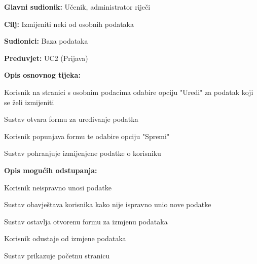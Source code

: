 				\noindent {}
				\begin{packed_item}
					
					\item \textbf{Glavni sudionik: }Učenik, administrator riječi
					\item  \textbf{Cilj:} Izmijeniti neki od osobnih podataka
					\item  \textbf{Sudionici:} Baza podataka
					\item  \textbf{Preduvjet:} UC2 (Prijava)
					\item  \textbf{Opis osnovnog tijeka:}
					
					\item[] \begin{packed_enum}
						
						\item Korisnik na stranici s osobnim podacima odabire opciju "Uredi" za podatak koji se želi izmijeniti
						\item Sustav otvara formu za uređivanje podatka
						\item Korisnik popunjava formu te odabire opciju "Spremi"
						\item Sustav pohranjuje izmijenjene podatke o korisniku
						
					\end{packed_enum}
					
					\item  \textbf{Opis mogućih odstupanja:}
					
					\item[] \begin{packed_item}
						
						\item[3.a] Korisnik neispravno unosi podatke 
						\item[] \begin{packed_enum}
							
							\item Sustav obavještava korisnika kako nije ispravno unio nove podatke
							\item Sustav ostavlja otvorenu formu za izmjenu podataka
							
						\end{packed_enum}
						
						\item[3.b] Korisnik odustaje od izmjene podataka 
						\item[] \begin{packed_enum}
							
							\item Sustav prikazuje početnu stranicu
							
						\end{packed_enum}
						
						
					\end{packed_item}
				\end{packed_item}
				
